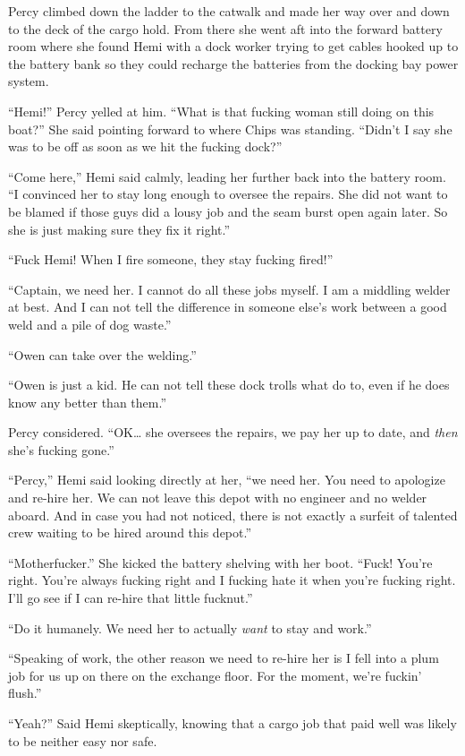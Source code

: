 \documentclass[]{scrbook}
\begin{document}
Percy climbed down the ladder to the catwalk and made her way over and
down to the deck of the cargo hold. From there she went aft into the
forward battery room where she found Hemi with a dock worker trying to
get cables hooked up to the battery bank so they could recharge the
batteries from the docking bay power system.

``Hemi!'' Percy yelled at him. ``What is that fucking woman still doing
on this boat?'' She said pointing forward to where Chips was standing.
``Didn't I say she was to be off as soon as we hit the fucking dock?''

``Come here,'' Hemi said calmly, leading her further back into the
battery room. ``I convinced her to stay long enough to oversee the
repairs. She did not want to be blamed if those guys did a lousy job and
the seam burst open again later. So she is just making sure they fix it
right.''

``Fuck Hemi! When I fire someone, they stay fucking fired!''

``Captain, we need her. I cannot do all these jobs myself. I am a
middling welder at best. And I can not tell the difference in someone
else's work between a good weld and a pile of dog waste.''

``Owen can take over the welding.''

``Owen is just a kid. He can not tell these dock trolls what do to, even
if he does know any better than them.''

Percy considered. ``OK\ldots{} she oversees the repairs, we pay her up
to date, and \emph{then} she's fucking gone.''

``Percy,'' Hemi said looking directly at her, ``we need her. You need to
apologize and re-hire her. We can not leave this depot with no engineer
and no welder aboard. And in case you had not noticed, there is not
exactly a surfeit of talented crew waiting to be hired around this
depot.''

``Motherfucker.'' She kicked the battery shelving with her boot. ``Fuck!
You're right. You're always fucking right and I fucking hate it when
you're fucking right. I'll go see if I can re-hire that little
fucknut.''

``Do it humanely. We need her to actually \emph{want} to stay and
work.''

``Speaking of work, the other reason we need to re-hire her is I fell
into a plum job for us up on there on the exchange floor. For the
moment, we're fuckin' flush.''

``Yeah?'' Said Hemi skeptically, knowing that a cargo job that paid well
was likely to be neither easy nor safe.
\end{document}
